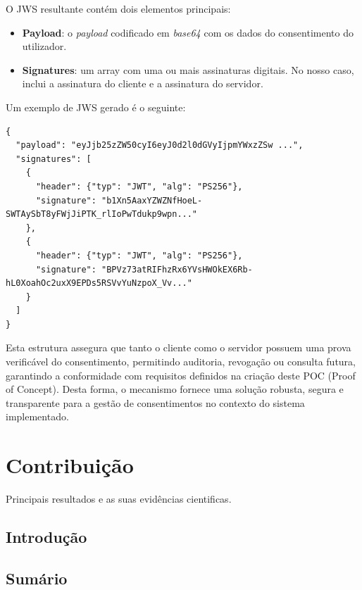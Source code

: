 O JWS resultante contém dois elementos principais:

\begin{itemize}
    \item \textbf{Payload}: o \textit{payload} codificado em \textit{base64} com os dados do consentimento do utilizador.
    \item \textbf{Signatures}: um array com uma ou mais assinaturas digitais. No nosso caso, inclui a assinatura do cliente e a assinatura do servidor.
\end{itemize}

Um exemplo de JWS gerado é o seguinte:

\begin{lstlisting}
{
  "payload": "eyJjb25zZW50cyI6eyJ0d2l0dGVyIjpmYWxzZSw ...",
  "signatures": [
    {
      "header": {"typ": "JWT", "alg": "PS256"},
      "signature": "b1Xn5AaxYZWZNfHoeL-SWTAySbT8yFWjJiPTK_rlIoPwTdukp9wpn..."
    },
    {
      "header": {"typ": "JWT", "alg": "PS256"},
      "signature": "BPVz73atRIFhzRx6YVsHWOkEX6Rb-hL0XoahOc2uxX9EPDs5RSVvYuNzpoX_Vv..."
    }
  ]
}
\end{lstlisting}

Esta estrutura assegura que tanto o cliente como o servidor possuem uma prova verificável do consentimento, permitindo auditoria, revogação ou consulta futura, garantindo a conformidade com requisitos definidos na criação deste POC (Proof of Concept). Desta forma, o mecanismo fornece uma solução robusta, segura e transparente para a gestão de consentimentos no contexto do sistema implementado.

\chapter{Contribuição}

Principais resultados e as suas evidências cientificas.

\section{Introdução}

\section{Sumário}
